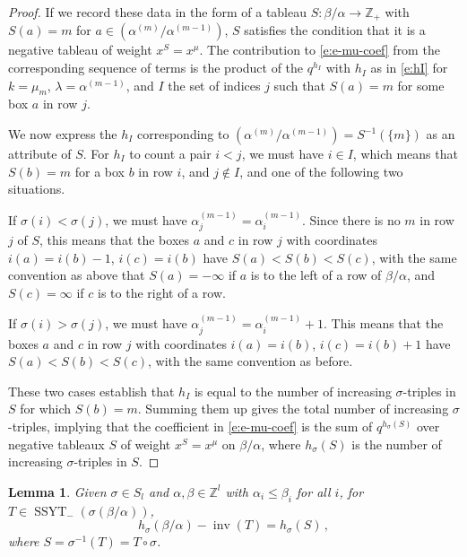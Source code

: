 \documentclass[12pt]{amsart}
\newtheorem{lemma}[thm]{Lemma}
\theoremstyle{definition}
\theoremstyle{remark}
\newcommand{\ZZ}{{\mathbb Z}}
\DeclareMathOperator{\inv}{inv}
\DeclareMathOperator{\SSYT}{SSYT}
\begin{document}
\begin{proof}
If we record these data in the form of a tableau $S\colon \beta
/\alpha \rightarrow \ZZ _{+}$ with $S(a) = m$ for $a\in (\alpha
^{(m)}/\alpha ^{(m-1)})$, $S$ satisfies the condition that it is a
negative tableau of weight $x^{S} = x^{\mu }$.  The contribution to
\eqref{e:e-mu-coef} from the corresponding sequence of terms is the
product of the $q^{h_{I}}$ with $h_{I}$ as in \eqref{e:hI} for $k= \mu
_{m}$, $\lambda =\alpha ^{(m-1)}$, and $I$ the set of indices $j$ such
that $S(a) = m$ for some box $a$ in row $j$.

We now express the $h_{I}$ corresponding to $(\alpha ^{(m)}/\alpha
^{(m-1)}) = S^{-1}(\{m \})$ as an attribute of $S$.  For $h_{I}$ to
count a pair $i<j$, we must have $i\in I$, which means that $S(b) = m$
for a box $b$ in row $i$, and $j\not \in I$, and one of the following
two situations.

If $\sigma (i)<\sigma (j)$, we must have $\alpha ^{(m-1)}_{j} = \alpha
^{(m-1)}_{i}$.  Since there is no $m$ in row $j$ of $S$, this means
that the boxes $a$ and $c$ in row $j$ with coordinates $i(a) =
i(b)-1$, $i(c) = i(b)$ have $S(a)<S(b)<S(c)$, with the same convention
as above that $S(a) = -\infty $ if $a$ is to the left of a row of
$\beta /\alpha $, and $S(c) = \infty $ if $c$ is to the right of a
row.

If $\sigma (i)>\sigma (j)$, we must have $\alpha ^{(m-1)}_{j} = \alpha
^{(m-1)}_{i}+1$.  This means that the boxes $a$ and $c$ in row $j$
with coordinates $i(a) = i(b)$, $i(c) = i(b)+1$ have $S(a)<S(b)<S(c)$,
with the same convention as before.

These two cases establish that $h_{I}$ is equal to the number of
increasing $\sigma $-triples in $S$ for which $S(b) = m$.  Summing
them up gives the total number of increasing $\sigma $-triples,
implying that
the coefficient in \eqref{e:e-mu-coef} is
the sum of $q^{h_{\sigma }(S)}$ over negative tableaux $S$ of weight
$x^{S} = x^{\mu }$ on $\beta /\alpha $, where $h_{\sigma }(S)$ is the
number of increasing $\sigma $-triples in $S$.
\end{proof}

\begin{lemma}\label{l:triples2dinv}
Given $\sigma\in S_l$ and $\alpha ,\beta \in \ZZ ^{l}$ with $\alpha
_{i}\leq \beta _{i}$ for all $i$, for $T\in
\SSYT_{-}(\sigma(\beta/\alpha))$,
\begin{equation}
h_{\sigma }(\beta /\alpha )-\inv (T)= h_{\sigma }(S)\,,
\end{equation}
where $S = \sigma ^{-1}(T) = T\circ \sigma $.
\end{lemma}
\end{document}

